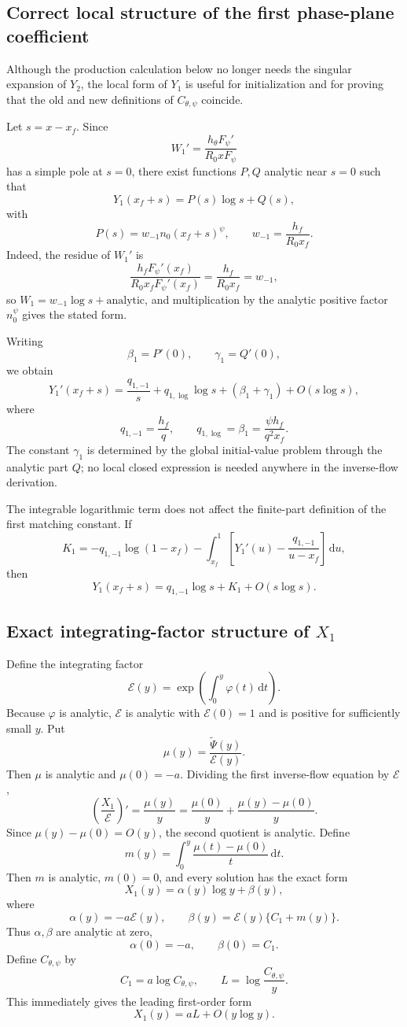 \documentclass[11pt]{article}
\newcommand{\xf}{x_f}
\newcommand{\dd}{\,\mathrm{d}}
\begin{document}
\subsection{Correct local structure of the first phase-plane coefficient}
Although the production calculation below no longer needs the singular expansion of \(Y_2\), the local form of \(Y_1\) is useful for initialization and for proving that the old and new definitions of \(C_{\theta,\psi}\) coincide.

Let \(s=x-\xf\).  Since
\[
W_1'=\frac{h_\theta F_\psi'}{R_0xF_\psi}
\]
has a simple pole at \(s=0\), there exist functions \(P,Q\) analytic near \(s=0\) such that
\[
\boxed{
Y_1(\xf+s)=P(s)\log s+Q(s)},
\]
with
\[
P(s)=w_{-1}n_0(\xf+s)^\psi,
\qquad
w_{-1}=\frac{h_f}{R_0\xf}.
\]
Indeed, the residue of \(W_1'\) is
\[
\frac{h_fF_\psi'(\xf)}{R_0\xf F_\psi'(\xf)}
=\frac{h_f}{R_0\xf}=w_{-1},
\]
so \(W_1=w_{-1}\log s+\text{analytic}\), and multiplication by the analytic positive factor \(n_0^\psi\) gives the stated form.

Writing
\[
\beta_1=P'(0),
\qquad
\gamma_1=Q'(0),
\]
we obtain
\[
\boxed{
Y_1'(\xf+s)
=\frac{q_{1,-1}}{s}
+q_{1,\log}\log s
+(\beta_1+\gamma_1)
+O(s\log s)},
\]
where
\[
\boxed{q_{1,-1}=\frac{h_f}{q}},
\qquad
\boxed{q_{1,\log}=\beta_1=\frac{\psi h_f}{q^2\xf}}.
\]
The constant \(\gamma_1\) is determined by the global initial-value problem through the analytic part \(Q\); no local closed expression is needed anywhere in the inverse-flow derivation.

The integrable logarithmic term does not affect the finite-part definition of the first matching constant.  If
\[
K_1
=-q_{1,-1}\log(1-\xf)
-\int_{\xf}^{1}
\left[Y_1'(u)-\frac{q_{1,-1}}{u-\xf}\right]\dd u,
\]
then
\[
Y_1(\xf+s)=q_{1,-1}\log s+K_1+O(s\log s).
\]

\subsection{Exact integrating-factor structure of \texorpdfstring{\(X_1\)}{X1}}
Define the integrating factor
\[
\mathcal E(y)=\exp\left(\int_0^y\varphi(t)\dd t\right).
\]
Because \(\varphi\) is analytic, \(\mathcal E\) is analytic with \(\mathcal E(0)=1\) and is positive for sufficiently small \(y\).  Put
\[
\mu(y)=\frac{\widetilde\Psi(y)}{\mathcal E(y)}.
\]
Then \(\mu\) is analytic and \(\mu(0)=-a\).  Dividing the first inverse-flow equation by \(\mathcal E\),
\[
\left(\frac{X_1}{\mathcal E}\right)'
=\frac{\mu(y)}{y}
=\frac{\mu(0)}{y}+\frac{\mu(y)-\mu(0)}{y}.
\]
Since \(\mu(y)-\mu(0)=O(y)\), the second quotient is analytic.  Define
\[
m(y)=\int_0^y\frac{\mu(t)-\mu(0)}{t}\dd t.
\]
Then \(m\) is analytic, \(m(0)=0\), and every solution has the exact form
\[
\boxed{
X_1(y)=\alpha(y)\log y+\beta(y)},
\]
where
\[
\alpha(y)=-a\mathcal E(y),
\qquad
\beta(y)=\mathcal E(y)\{C_1+m(y)\}.
\]
Thus \(\alpha,\beta\) are analytic at zero,
\[
\alpha(0)=-a,
\qquad
\beta(0)=C_1.
\]
Define \(C_{\theta,\psi}\) by
\[
C_1=a\log C_{\theta,\psi},
\qquad
L=\log\frac{C_{\theta,\psi}}{y}.
\]
This immediately gives the leading first-order form
\[
X_1(y)=aL+O(y\log y).
\]
\end{document}
